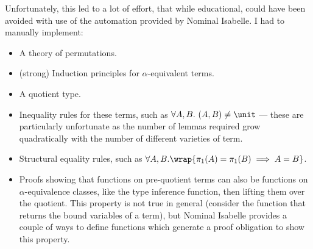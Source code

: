 Unfortunately, this led to a lot of effort, that while educational, could have been avoided with use of the automation provided by Nominal Isabelle.
I had to manually implement:
\begin{itemize}
\item
A theory of permutations.
\item
(strong) Induction principles for \(\alpha\)-equivalent terms.
\item
A quotient type.
\item
Inequality rules for these terms, such as \(\forall A, B.\ (A, B) \neq \unit\) --- these are particularly unfortunate as the number of lemmas required grow quadratically with the number of different varieties of term.
\item
Structural equality rules, such as \(\forall A, B.\wrap{\pi_1(A) = \pi_1(B) \implies A = B}\).
\item
Proofs showing that functions on pre-quotient terms can also be functions on \(\alpha\)-equivalence classes, like the type inference function, then lifting them over the quotient.
This property is not true in general (consider the function that returns the bound variables of a term), but Nominal Isabelle provides a couple of ways to define functions which generate a proof obligation to show this property\cite{fresh-fun}.
\end{itemize}
